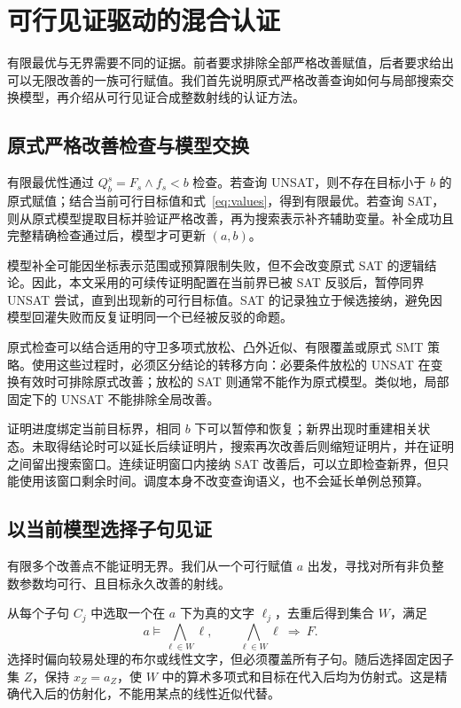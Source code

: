 \section{可行见证驱动的混合认证}
\label{sec:certificate}

有限最优与无界需要不同的证据。前者要求排除全部严格改善赋值，后者要求给出可以无限改善的一族可行赋值。我们首先说明原式严格改善查询如何与局部搜索交换模型，再介绍从可行见证合成整数射线的认证方法。

\subsection{原式严格改善检查与模型交换}
有限最优性通过 $Q_b^s=F_s\land f_s<b$ 检查。若查询 UNSAT，则不存在目标小于 $b$ 的原式赋值；结合当前可行目标值和式~\eqref{eq:values}，得到有限最优。若查询 SAT，则从原式模型提取目标并验证严格改善，再为搜索表示补齐辅助变量。补全成功且完整精确检查通过后，模型才可更新 $(a,b)$。

模型补全可能因坐标表示范围或预算限制失败，但不会改变原式 SAT 的逻辑结论。因此，本文采用的可续传证明配置在当前界已被 SAT 反驳后，暂停同界 UNSAT 尝试，直到出现新的可行目标值。SAT 的记录独立于候选接纳，避免因模型回灌失败而反复证明同一个已经被反驳的命题。

原式检查可以结合适用的守卫多项式放松、凸外近似、有限覆盖或原式 SMT 策略。使用这些过程时，必须区分结论的转移方向：必要条件放松的 UNSAT 在变换有效时可排除原式改善；放松的 SAT 则通常不能作为原式模型。类似地，局部固定下的 UNSAT 不能排除全局改善。

证明进度绑定当前目标界，相同 $b$ 下可以暂停和恢复；新界出现时重建相关状态。未取得结论时可以延长后续证明片，搜索再次改善后则缩短证明片，并在证明之间留出搜索窗口。连续证明窗口内接纳 SAT 改善后，可以立即检查新界，但只能使用该窗口剩余时间。调度本身不改变查询语义，也不会延长单例总预算。

\subsection{以当前模型选择子句见证}
有限多个改善点不能证明无界。我们从一个可行赋值 $a$ 出发，寻找对所有非负整数参数均可行、且目标永久改善的射线。

从每个子句 $C_j$ 中选取一个在 $a$ 下为真的文字 $\ell_j$，去重后得到集合 $W$，满足
\begin{equation}
 a\models\bigwedge_{\ell\in W}\ell,
 \qquad \bigwedge_{\ell\in W}\ell\ \Longrightarrow\ F.
 \label{eq:witness}
\end{equation}
选择时偏向较易处理的布尔或线性文字，但必须覆盖所有子句。随后选择固定因子集 $Z$，保持 $x_Z=a_Z$，使 $W$ 中的算术多项式和目标在代入后均为仿射式。这是精确代入后的仿射化，不能用某点的线性近似代替。

